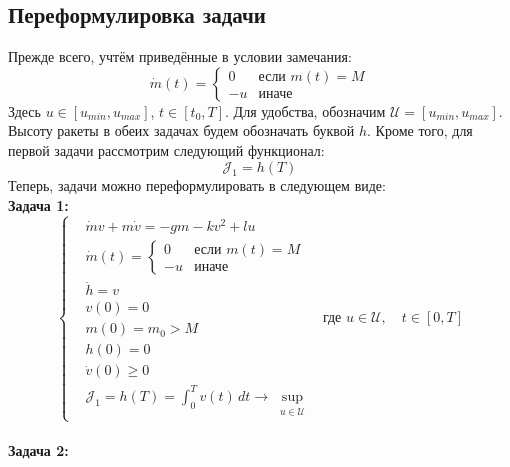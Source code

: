 \documentclass[11pt, oneside, final]{article}
\theoremstyle{break}
\numberwithin{equation}{section}
\theoremstyle{plain}
\theoremstyle{definition}
\begin{document}
    \subsection{Переформулировка задачи}
    \label{sub:new}
    Прежде всего, учтём приведённые в условии замечания:
    \begin{equation}
        \dot m(t) = \begin{cases} 0& \text{если $m(t) = M$} \\ 
                                 -u& \text{иначе}
                     \end{cases}
    \end{equation}
    Здесь \(u \in [u_{min}, u_{max}]\), \(t \in [t_0, T]\).
    Для удобства, обозначим \(\mathcal{U} = [u_{min}, u_{max}] \).
    Высоту ракеты в обеих задачах будем обозначать буквой \(h\).
    Кроме того, для первой задачи рассмотрим следующий функционал:
    \[
        \mathcal{J}_1 = h(T)
    \]
    Теперь, задачи можно переформулировать в следующем виде: \\
    \textbf{Задача 1:}
    \begin{equation}
        \label{eq:task1}
        \left\{
        \begin{aligned}
            &\dot mv + m \dot v = -gm - kv^2 + lu \\
            &\dot m(t) = \begin{cases} 0& \text{если $m(t) = M$} \\ 
                                 -u& \text{иначе}
                     \end{cases} \\
            &\dot h = v\\
            &v(0) = 0 \\
            &m(0) = m_0 > M \\
            &h(0) = 0 \\
            &\dot v(0) \geqslant 0 \\
            &\mathcal{J}_1 = h(T) = \int_0^T{v(t) \, dt} \rightarrow \sup_{\substack{u \in \mathcal{U}}}
        \end{aligned}
        \right.
        \text{ где }u \in \mathcal{U},\quad t \in [0, T]
    \end{equation}
    \\
    \textbf{Задача 2:}
\end{document}
